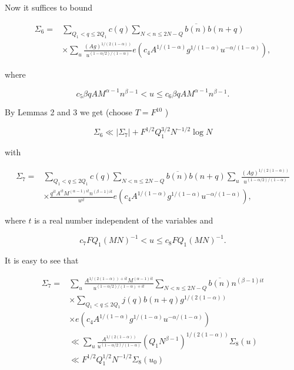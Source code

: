 \documentclass[10pt]{article}
\begin{document}
Now it suffices to bound


\begin{align*}
\Sigma_{6}= & \sum_{Q_{1}<q \leq 2 Q_{1}} c(q) \sum_{N<n \leq 2 N-Q} \overline{b(n)} b(n+q)  \tag{2.21}\\
& \times \sum_{u} \frac{(A g)^{1 /(2(1-\alpha))}}{u^{(1-\alpha / 2) /(1-\alpha)}} e\left(c_{4} A^{1 /(1-\alpha)} g^{1 /(1-\alpha)} u^{-\alpha /(1-\alpha)}\right),
\end{align*}


where

$$
c_{5} \beta q A M^{\alpha-1} n^{\beta-1}<u \leq c_{6} \beta q A M^{\alpha-1} n^{\beta-1}.
$$

By Lemmas 2 and 3 we get (choose $T=F^{10}$ )


\begin{equation*}
\Sigma_{6} \ll\left|\Sigma_{7}\right|+F^{1 / 2} Q_{1}^{3 / 2} N^{-1 / 2} \log N \tag{2.22}
\end{equation*}


with


\begin{align*}
\Sigma_{7}= & \sum_{Q_{1}<q \leq 2 Q_{1}} c(q) \sum_{N<n \leq 2 N-Q} \overline{b(n)} b(n+q) \sum_{u} \frac{(A g)^{1 /(2(1-\alpha))}}{u^{(1-\alpha / 2) /(1-\alpha)}}  \tag{2.23}\\
& \times \frac{q^{i t} A^{i t} M^{(\alpha-1) i t} n^{(\beta-1) i t}}{u^{i t}} e\left(c_{4} A^{1 /(1-\alpha)} g^{1 /(1-\alpha)} u^{-\alpha /(1-\alpha)}\right),
\end{align*}


where $t$ is a real number independent of the variables and

$$
c_{7} F Q_{1}(M N)^{-1}<u \leq c_{8} F Q_{1}(M N)^{-1}.
$$

It is easy to see that


\begin{align*}
\Sigma_{7}= & \sum_{u} \frac{A^{1 /(2(1-\alpha))+i t} M^{(\alpha-1) i t}}{u^{(1-\alpha / 2) /(1-\alpha)+i t}} \sum_{N<n \leq 2 N-Q} \overline{b(n)} n^{(\beta-1) i t}  \tag{2.24}\\
& \times \sum_{Q_{1}<q \leq 2 Q_{1}} j(q) b(n+q) g^{1 /(2(1-\alpha))} \\
& \times e\left(c_{4} A^{1 /(1-\alpha)} g^{1 /(1-\alpha)} u^{-\alpha /(1-\alpha)}\right) \\
& \ll \sum_{u} \frac{A^{1/(2(1-\alpha))}}{u^{(1-\alpha/2)/(1-\alpha)}}
\left(Q_{1}N^{\beta-1}\right)^{1/(2(1-\alpha))}\Sigma_{8}(u) \\
& \ll F^{1 / 2} Q_{1}^{1 / 2} N^{-1 / 2} \Sigma_{8}\left(u_{0}\right)
\end{align*}
\end{document}
